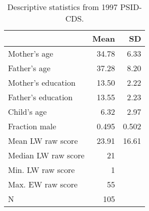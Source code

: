 \begin{table}[ht]
\centering
\begin{tabular}{lrr}
  \hline
 & Mean & SD \\ 
  \hline
Mother's age & 34.78 & 6.33 \\ 
  Father's age & 37.28 & 8.20 \\ 
  Mother's education & 13.50 & 2.22 \\ 
  Father's education & 13.55 & 2.23 \\ 
  Child's age & 6.32 & 2.97 \\ 
  Fraction male & 0.495 & 0.502 \\ 
  Mean LW raw score & 23.91 & 16.61 \\ 
  Median LW raw score & 21 &  \\ 
  Min. LW raw score & 1 &  \\ 
  Max. EW raw score & 55 &  \\ 
  N & 105 &  \\ 
   \hline
\end{tabular}
\caption{Descriptive statistics from 1997 PSID-CDS.} 
\label{desc1}
\end{table}
